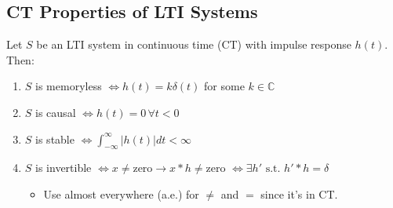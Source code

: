 \subsection{CT Properties of LTI Systems}
\begin{theorem}
    Let \( S \) be an LTI system in continuous time (CT) with impulse response \( h(t) \). Then:
    \begin{enumerate}
        \item \( S \) is memoryless \( \iff h(t) = k \delta(t) \) for some \( k \in \mathbb{C} \)
        \item \( S \) is causal \( \iff h(t) = 0 \, \forall t < 0 \)
        \item \( S \) is stable \( \iff \int_{-\infty}^{\infty} |h(t)| dt < \infty \)
        \item \( S \) is invertible \( \iff x \neq \text{zero} \rightarrow x * h \neq \text{zero} \) \( \iff \exists h' \text{ s.t. } h' * h = \delta \)
        \begin{itemize}
            \item Use almost everywhere (a.e.) for \( \neq \) and $=$ since it's in CT.
        \end{itemize}
    \end{enumerate}
\end{theorem}


